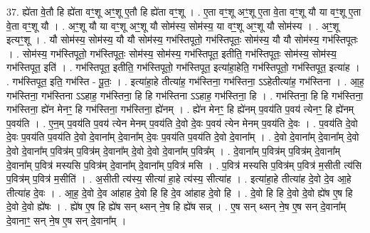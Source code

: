 \documentclass[17pt]{extarticle}
\begin{document}
37. ह्ये॑ता वे॒तौ हि ह्ये॑ता वꣳ॒॒शू अꣳ॒॒शू ए॒तौ हि ह्ये॑ता वꣳ॒॒शू । . ए॒ता वꣳ॒॒शू अꣳ॒॒शू ए॒ता वे॒ता वꣳ॒॒शू यौ या वꣳ॒॒शू ए॒ता वे॒ता वꣳ॒॒शू यौ । . अꣳ॒॒शू यौ या वꣳ॒॒शू अꣳ॒॒शू यौ सोम॑स्य॒ सोम॑स्य॒ या वꣳ॒॒शू अꣳ॒॒शू यौ सोम॑स्य । . अꣳ॒॒शू इत्यꣳ॒॒शू । . यौ सोम॑स्य॒ सोम॑स्य॒ यौ यौ सोम॑स्य॒ गभ॑स्तिपूतो॒ गभ॑स्तिपूतः॒ सोम॑स्य॒ यौ यौ सोम॑स्य॒ गभ॑स्तिपूतः । . सोम॑स्य॒ गभ॑स्तिपूतो॒ गभ॑स्तिपूतः॒ सोम॑स्य॒ सोम॑स्य॒ गभ॑स्तिपूत॒ इतीति॒ गभ॑स्तिपूतः॒ सोम॑स्य॒ सोम॑स्य॒ गभ॑स्तिपूत॒ इति॑ । . गभ॑स्तिपूत॒ इतीति॒ गभ॑स्तिपूतो॒ गभ॑स्तिपूत॒ इत्या॑हा॒हेति॒ गभ॑स्तिपूतो॒ गभ॑स्तिपूत॒ इत्या॑ह । . गभ॑स्तिपूत॒ इति॒ गभ॑स्ति - पू॒तः॒ । . इत्या॑हा॒हे तीत्या॑ह॒ गभ॑स्तिना॒ गभ॑स्तिना॒ ऽऽहेतीत्या॑ह॒ गभ॑स्तिना । . आ॒ह॒ गभ॑स्तिना॒ गभ॑स्तिना ऽऽहाह॒ गभ॑स्तिना॒ हि हि गभ॑स्तिना ऽऽहाह॒ गभ॑स्तिना॒ हि । . गभ॑स्तिना॒ हि हि गभ॑स्तिना॒ गभ॑स्तिना॒ ह्ये॑न मेनꣳ॒॒ हि गभ॑स्तिना॒ गभ॑स्तिना॒ ह्ये॑नम् । . ह्ये॑न मेनꣳ॒॒ हि ह्ये॑नम् प॒वय॑ति प॒वय॑ त्येनꣳ॒॒ हि ह्ये॑नम् प॒वय॑ति । . ए॒न॒म् प॒वय॑ति प॒वय॑ त्येन मेनम् प॒वय॑ति दे॒वो दे॒वः प॒वय॑ त्येन मेनम् प॒वय॑ति दे॒वः । . प॒वय॑ति दे॒वो दे॒वः प॒वय॑ति प॒वय॑ति दे॒वो दे॒वाना᳚म् दे॒वाना᳚म् दे॒वः प॒वय॑ति प॒वय॑ति दे॒वो दे॒वाना᳚म् । . दे॒वो दे॒वाना᳚म् दे॒वाना᳚म् दे॒वो दे॒वो दे॒वाना᳚म् प॒वित्र॑म् प॒वित्र॑म् दे॒वाना᳚म् दे॒वो दे॒वो दे॒वाना᳚म् प॒वित्र᳚म् । . दे॒वाना᳚म् प॒वित्र॑म् प॒वित्र॑म् दे॒वाना᳚म् दे॒वाना᳚म् प॒वित्र॑ मस्यसि प॒वित्र॑म् दे॒वाना᳚म् दे॒वाना᳚म् प॒वित्र॑ मसि । . प॒वित्र॑ मस्यसि प॒वित्र॑म् प॒वित्र॑ म॒सीती त्य॑सि प॒वित्र॑म् प॒वित्र॑ म॒सीति॑ । . अ॒सीती त्य॑स्य॒ सीत्या॑ हा॒हे त्य॑स्य॒ सीत्या॑ह । . इत्या॑हा॒हे तीत्या॑ह दे॒वो दे॒व आ॒हे तीत्या॑ह दे॒वः । . आ॒ह॒ दे॒वो दे॒व आ॑हाह दे॒वो हि हि दे॒व आ॑हाह दे॒वो हि । . दे॒वो हि हि दे॒वो दे॒वो ह्ये॑ष ए॒ष हि दे॒वो दे॒वो ह्ये॑षः । . ह्ये॑ष ए॒ष हि ह्ये॑ष सन् थ्सन् ने॒ष हि ह्ये॑ष सन्न् । . ए॒ष सन् थ्सन् ने॒ष ए॒ष सन् दे॒वाना᳚म् दे॒वानाꣳ॒॒ सन् ने॒ष ए॒ष सन् दे॒वाना᳚म् । \newline
\pagebreak
{}
\end{document}
